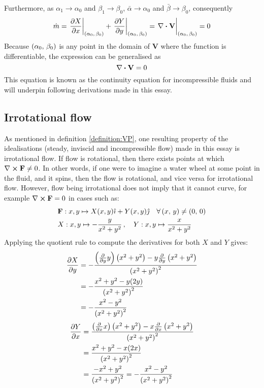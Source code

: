 Furthermore, as $\alpha_1\rightarrow\alpha_0$ and $\beta_1\rightarrow\beta_0$, $\bar{\alpha}\rightarrow\alpha_0$ and $\bar{\beta}\rightarrow\beta_0$, consequently
$$
    \dot{m}=\eval{\pdv{X}{x}}_{\point{\alpha_0}{\beta_0}}+\eval{\pdv{Y}{y}}_{\point{\alpha_0}{\beta_0}}=\eval{\divergence{\mathbf{V}}}_{\point{\alpha_0}{\beta_0}}=0
$$
Because $\left(\alpha_0,\,\beta_0\right)$ is any point in the domain of $\mathbf{V}$ where the function is differentiable, the expression can be generalised as
$$
    \divergence{\mathbf{V}}=0
$$
This equation is known as the continuity equation for incompressible fluids \cite{PHAM2014405} and will underpin following derivations made in this essay.

\subsection{Irrotational flow}\label{section:IRROTATIONAL}
As mentioned in definition \ref{definition:VP}, one resulting property of the idealisations (steady, inviscid and incompressible flow)
made in this essay is irrotational flow. If flow is rotational, then there exists points at which $\curl{\fatf}\neq0$. In other words, if one were to
imagine a water wheel at some point in the fluid, and it spins, then the flow is rotational, and vice versa for irrotational flow.
However, flow being irrotational does not imply that it cannot curve, for example $\curl{\fatf}=0$ in cases such as:
\begin{align*}
    &\fatf:x,y\mapsto X(x,y)\ihat+Y(x,y)\jhat\quad\forall\point{x}{y}\neq\point{0}{0}\\
    &X:x,y\mapsto-\frac{y}{x^2+y^2}\,\qc Y:x,y\mapsto\frac{x}{x^2+y^2}
\end{align*}
Applying the quotient rule to compute the derivatives for both $X$ and $Y$ gives:
\begin{align*}
    \pdv{X}{y}&=-\frac{\left(\pdv{y}y\right)\left(x^2+y^2\right)-y\pdv{y}\left(x^2+y^2\right)}{\left(x^2+y^2\right)^2}\\
    &=-\frac{x^2+y^2-y(2y)}{\left(x^2+y^2\right)^2}\\
    &=-\frac{x^2-y^2}{\left(x^2+y^2\right)^2}
\end{align*}
\begin{align*}
    \pdv{Y}{x}&=\frac{\left(\pdv{x}x\right)\left(x^2+y^2\right)-x\pdv{x}\left(x^2+y^2\right)}{\left(x^2+y^2\right)^2}\\
    &=\frac{x^2+y^2-x(2x)}{\left(x^2+y^2\right)^2}\\
    &=\frac{-x^2+y^2}{\left(x^2+y^2\right)^2}=-\frac{x^2-y^2}{\left(x^2+y^2\right)^2}
\end{align*}
